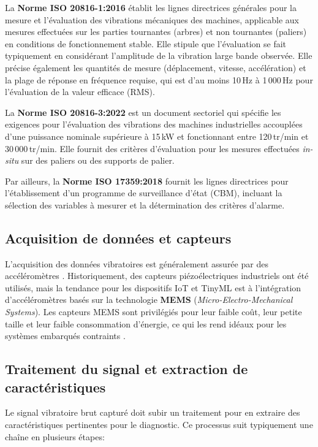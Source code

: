 La \textbf{Norme ISO 20816-1:2016} \cite{iso20816-1} établit les lignes directrices générales pour la mesure et l'évaluation des vibrations mécaniques des machines, applicable aux mesures effectuées sur les parties tournantes (arbres) et non tournantes (paliers) en conditions de fonctionnement stable. Elle stipule que l'évaluation se fait typiquement en considérant l'amplitude de la vibration large bande observée. Elle précise également les quantités de mesure (déplacement, vitesse, accélération) et la plage de réponse en fréquence requise, qui est d'au moins 10\,Hz à 1\,000\,Hz pour l'évaluation de la valeur efficace (RMS).

La \textbf{Norme ISO 20816-3:2022} \cite{iso20816-3} est un document sectoriel qui spécifie les exigences pour l'évaluation des vibrations des machines industrielles accouplées d'une puissance nominale supérieure à 15\,kW et fonctionnant entre 120\,tr/min et 30\,000\,tr/min. Elle fournit des critères d'évaluation pour les mesures effectuées \textit{in-situ} sur des paliers ou des supports de palier.

Par ailleurs, la \textbf{Norme ISO 17359:2018} \cite{iso17359} fournit les lignes directrices pour l'établissement d'un programme de surveillance d'état (CBM), incluant la sélection des variables à mesurer et la détermination des critères d'alarme.

\subsection{Acquisition de données et capteurs}

L'acquisition des données vibratoires est généralement assurée par des accéléromètres \cite{hassan2024}. Historiquement, des capteurs piézoélectriques industriels ont été utilisés, mais la tendance pour les dispositifs IoT et TinyML est à l'intégration d'accéléromètres basés sur la technologie \textbf{MEMS} (\textit{Micro-Electro-Mechanical Systems}). Les capteurs MEMS sont privilégiés pour leur faible coût, leur petite taille et leur faible consommation d'énergie, ce qui les rend idéaux pour les systèmes embarqués contraints \cite{hassan2024,arciniegas2025}.

\subsection{Traitement du signal et extraction de caractéristiques}

Le signal vibratoire brut capturé doit subir un traitement pour en extraire des caractéristiques pertinentes pour le diagnostic. Ce processus suit typiquement une chaîne en plusieurs étapes:

